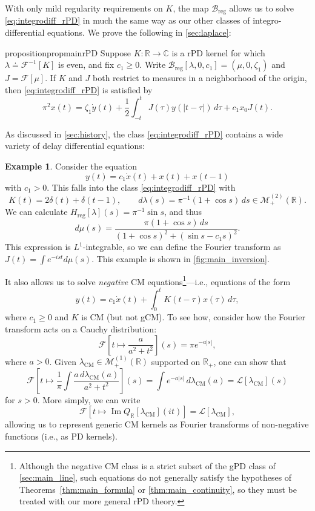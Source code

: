 \documentclass{cams-l} %
\newcommand{\dave}[1]{#1}\newcommand{\davebegin}{}\newcommand{\daveend}{}\newcommand{\george}[1]{#1}
\newcommand{\CC}{\mathbb C}
\newcommand{\RR}{\mathbb R}
\newcommand{\cL}{\mathcal L}
\newcommand{\cM}{\mathcal M}
\newcommand{\cB}{\mathcal B}
\newcommand{\cF}{\mathcal F}
\newcommand{\op}{\operatorname}
\renewcommand{\Im}{\op{Im}}
\theoremstyle{definition}
\newtheorem{example}[theorem]{Example}
\theoremstyle{remark}
\numberwithin{equation}{section}
\begin{document}
With only mild regularity requirements on $K$, the map $\cB_\mathrm{reg}$ allows us to solve \ref{eq:integrodiff_rPD} in much the same way as our other classes of integro-differential equations. \dave{We prove the following in \cref{sec:laplace}:}
\begin{restatable}{proposition}{propmainrPD}\label{prop:rPD}
Suppose $K:\RR\to\CC$ is a rPD kernel for which $\lambda\doteq\cF^{-1}[K]$ is even, and fix $c_1\geq 0$. Write $\cB_\mathrm{reg}[\lambda,0,c_1] = (\mu,0,\zeta_1)$ and $J = \cF[\mu]$. If $K$ and $J$ both restrict to measures in a neighborhood of the origin, then \ref{eq:integrodiff_rPD} is satisfied by
    \[\pi^{2}x(t) = \zeta_1\dot{y}(t)  + \frac{1}{2}\int_{-t}^t J(\tau)y(|t-\tau|)\,d\tau + c_1x_0J(t).\]
\end{restatable}

As discussed in \cref{sec:history}, the class \ref{eq:integrodiff_rPD} contains a wide variety of delay differential equations:
\begin{example}\label{ex:rPD}
    Consider the equation
    \[y(t) = c_1\dot{x}(t) + x(t) + x(t-1)\]
    with $c_1>0$. This falls into the class \ref{eq:integrodiff_rPD} with
    \[K(t) = 2\delta(t) + \delta(t-1),\qquad d\lambda(s) = \pi^{-1}(1+\cos s)\,ds\in\cM_+^{(2)}(\RR).\]
    We can calculate $H_\mathrm{reg}[\lambda](s) = \pi^{-1}\sin s$, and thus
    \[d\mu(s) = \frac{\pi(1+\cos s)\,ds}{(1+\cos s)^2 + (\sin s - c_1s)^2}.\]
    This expression is $L^1$-integrable, so we can define the Fourier transform as $J(t) = \int e^{-ist}d\mu(s)$. This example is shown in \cref{fig:main_inversion}.
\end{example}

It also allows us to solve \emph{negative} CM equations\footnote{Although the negative CM class is a strict subset of the gPD class of \cref{sec:main_line}, such equations do not generally satisfy the hypotheses of Theorems~\ref{thm:main_formula} or \ref{thm:main_continuity}, so they must be treated with our more general rPD theory.}---i.e., equations of the form
\[y(t) = c_1\dot{x}(t) + \int_0^t K(t-\tau)x(\tau)\,d\tau,\]
where $c_1\geq 0$ and $K$ is CM (but not gCM). To see how, consider how the Fourier transform acts on a Cauchy distribution:
\[\cF\left[t\mapsto \frac{a}{a^2+t^2}\right](s) = \pi e^{-a|s|},\]
where $a>0$. \dave{Given $\lambda_\mathrm{CM}\in\cM_+^{(1)}(\RR)$ supported on $\RR_+$, one can show that}
\[\cF\left[t\mapsto \frac{1}{\pi}\int \frac{a\,d\lambda_\mathrm{CM}(a)}{a^2+t^2}\right](s) = \int e^{-a|s|}\,d\lambda_\mathrm{CM}(a) = \cL[\lambda_\mathrm{CM}](s)\]
for $s>0$. More simply, we can write
\[\cF[t\mapsto \Im Q_\RR[\lambda_\mathrm{CM}](it)] = \cL[\lambda_\mathrm{CM}],\]
allowing us to represent generic CM kernels as Fourier transforms of non-negative functions (i.e., \dave{as} PD kernels).
\end{document}
